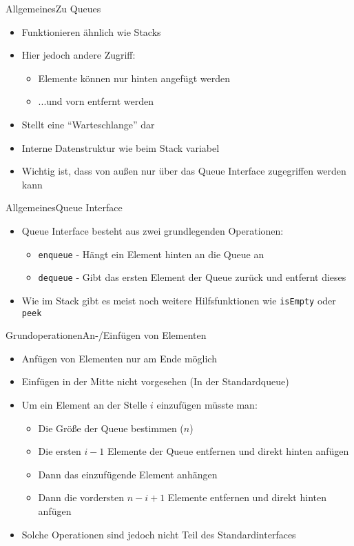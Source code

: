 \begin{frame}{Allgemeines}{Zu Queues}
	\begin{itemize}
		\item Funktionieren ähnlich wie Stacks
		\item Hier jedoch andere Zugriff:
		\begin{itemize}
			\item Elemente können nur hinten angefügt werden
			\item ...und vorn entfernt werden
		\end{itemize}
		\item Stellt eine "`Warteschlange"' dar
		\item Interne Datenstruktur wie beim Stack variabel
		\item Wichtig ist, dass von außen nur über das Queue Interface zugegriffen werden kann
	\end{itemize}
\end{frame}

\begin{frame}{Allgemeines}{Queue Interface}
	\begin{itemize}
		\item Queue Interface besteht aus zwei grundlegenden Operationen:
		\begin{itemize}
			\item \texttt{enqueue} - Hängt ein Element hinten an die Queue an 
			\item \texttt{dequeue} - Gibt das ersten Element der Queue zurück und entfernt dieses
		\end{itemize}
		\item Wie im Stack gibt es meist noch weitere Hilfsfunktionen wie \texttt{isEmpty} oder \texttt{peek}
	\end{itemize}
\end{frame}

\begin{frame}{Grundoperationen}{An-/Einfügen von Elementen}
	\begin{itemize}
		\item Anfügen von Elementen nur am Ende möglich
		\item Einfügen in der Mitte nicht vorgesehen (In der Standardqueue)
		\item Um ein Element an der Stelle $i$ einzufügen müsste man:
		\begin{itemize}
			\item Die Größe der Queue bestimmen ($n$)
			\item Die ersten $i-1$ Elemente der Queue entfernen und direkt hinten anfügen
			\item Dann das einzufügende Element anhängen
			\item Dann die vordersten $n-i+1$ Elemente entfernen und direkt hinten anfügen
		\end{itemize}
		\item Solche Operationen sind jedoch nicht Teil des Standardinterfaces
	\end{itemize}
\end{frame}

